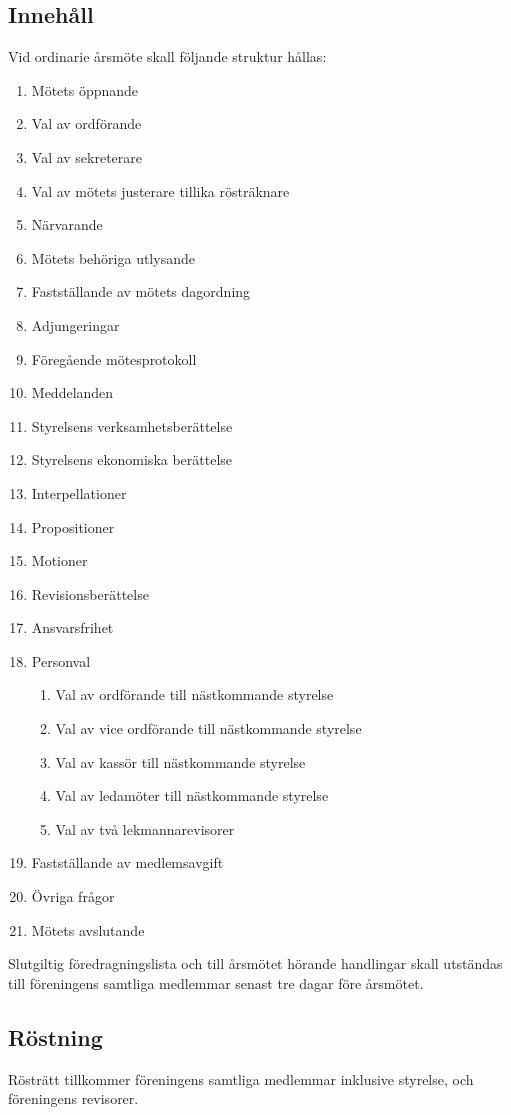 \subsection{Innehåll}
Vid ordinarie årsmöte skall följande struktur hållas:
\begin{enumerate}[label=§\arabic*]
    \item Mötets öppnande
\item Val av ordförande
\item Val av sekreterare
\item Val av mötets justerare tillika rösträknare
\item Närvarande
\item Mötets behöriga utlysande
\item Fastställande av mötets dagordning
\item Adjungeringar
\item Föregående mötesprotokoll
\item Meddelanden
\item Styrelsens verksamhetsberättelse
\item Styrelsens ekonomiska berättelse
\item Interpellationer
\item Propositioner
\item Motioner
\item Revisionsberättelse
\item Ansvarsfrihet
\item Personval
\begin{enumerate}[label*=.\arabic*]
    \item Val av ordförande till nästkommande styrelse
    \item Val av vice ordförande till nästkommande styrelse
    \item Val av kassör till nästkommande styrelse
    \item Val av ledamöter till nästkommande styrelse
    \item Val av två lekmannarevisorer
\end{enumerate}
\item Fastställande av medlemsavgift
\item Övriga frågor
\item Mötets avslutande
\end{enumerate}

Slutgiltig föredragningslista och till årsmötet hörande handlingar skall utständas till föreningens samtliga medlemmar senast tre dagar före årsmötet.
\subsection{Röstning}
Rösträtt tillkommer föreningens samtliga medlemmar inklusive styrelse, och föreningens revisorer.

